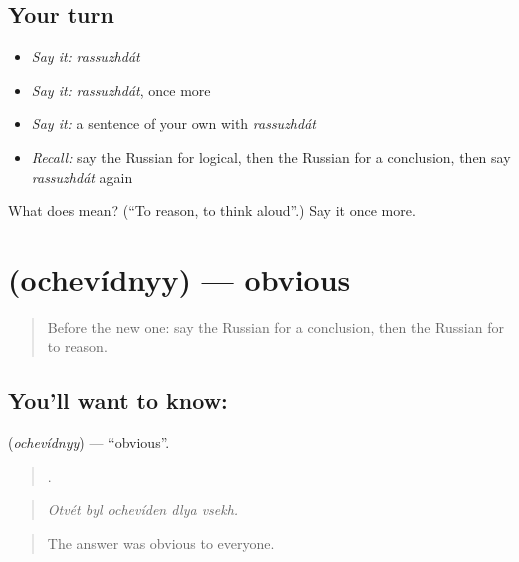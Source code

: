\subsection*{Your turn}
\begin{itemize}
\raggedright
  \item \emph{Say it:} \emph{rassuzhdát}
  \item \emph{Say it:} \emph{rassuzhdát}, once more
  \item \emph{Say it:} a sentence of your own with \emph{rassuzhdát}
  \item \emph{Recall:} say the Russian for logical, then the Russian for a conclusion, then say \emph{rassuzhdát} again
\end{itemize}

\begin{tcolorbox}[breakable,colback=teal!4,colframe=teal!35!black,title={Before you move on}]
What does  mean? (\textquotedblleft{}To reason, to think aloud\textquotedblright{}.) Say it once more.
\end{tcolorbox}
\section[\texorpdfstring{\ru{очевидный} (ochevídnyy)}{очевидный (ochevídnyy)}]{ (ochevídnyy) — obvious}

\label{lesson:RU-C344-ochevidnyy}



\begin{quote}
Before the new one: say the Russian for a conclusion, then the Russian for to reason.
\end{quote}

\subsection*{You'll want to know: }
\textbf{} (\emph{ochevídnyy}) — \textquotedblleft{}obvious\textquotedblright{}.

\begin{quote}
    .
\end{quote}

\begin{quote}
\emph{Otvét byl ochevíden dlya vsekh.}
\end{quote}

\begin{quote}
The answer was obvious to everyone.
\end{quote}

